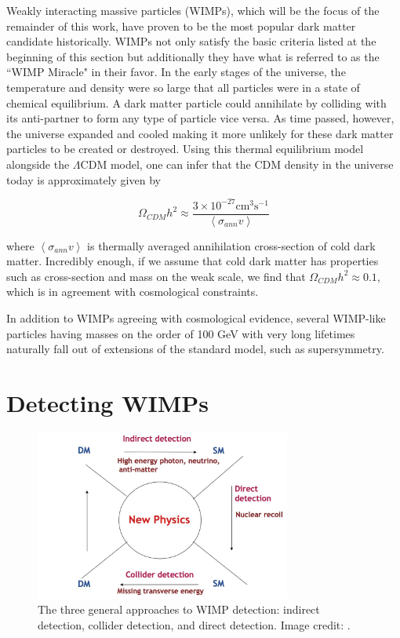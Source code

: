 Weakly interacting massive particles (WIMPs), which will be the focus of the remainder of this work, have proven to be the most popular dark matter candidate historically.   WIMPs not only satisfy the basic criteria listed at the beginning of this section but additionally they have what is referred to as the ``WIMP Miracle" in their favor.  In the early stages of the universe, the temperature and density were so large that all particles were in a state of chemical equilibrium.  A dark matter particle could annihilate by colliding with its anti-partner to form any type of particle vice versa.  As time passed, however, the universe expanded and cooled making it more unlikely for these dark matter particles to be created or destroyed.  Using this thermal equilibrium model alongside the $\Lambda$CDM model, one can infer that the CDM density in the universe today is approximately given by \cite{jungman1996supersymmetric, bertone2010particle}

\begin{equation}
        \Omega_{CDM}h^2 \approx \frac{3 \times 10^{-27} \mathrm{cm}^3  \mathrm{s}^{-1}}{\left< \sigma_{ann} v \right> }
\end{equation}

where $\left< \sigma_{ann} v \right>$ is thermally averaged annihilation cross-section of cold dark matter.  Incredibly enough, if we assume that cold dark matter has properties such as cross-section and mass on the weak scale, we find that $\Omega_{CDM}h^2 \approx 0.1$, which is in agreement with cosmological constraints. 

In addition to WIMPs agreeing with cosmological evidence, several WIMP-like particles having masses on the order of 100 GeV with very long lifetimes naturally fall out of extensions of the standard model, such as supersymmetry.  



\section{Detecting WIMPs}

\begin{figure}[b]
	\centering
	\includegraphics[width=0.75\textwidth]{wimp_detection}
	\caption{The three general approaches to WIMP detection: indirect detection, collider detection, and direct detection.  Image credit: \cite{bi2013status}.}
	\label{fig:wimp_detection}
\end{figure}

